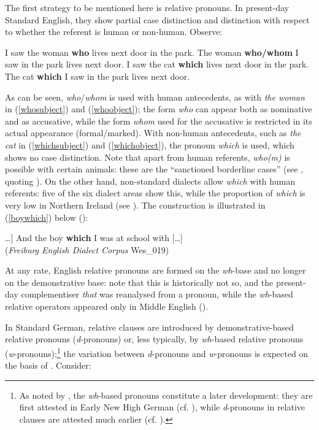The first strategy to be mentioned here is relative pronouns. In present-day Standard English, they show partial case distinction and distinction with respect to whether the referent is human or non-human. Observe:

\ea
\ea I saw the woman \textbf{who} lives next door in the park. \label{whosubject}
\ex The woman \textbf{who/whom} I saw in the park lives next door. \label{whoobject}
\ex I saw the cat \textbf{which} lives next door in the park. \label{whichsubject}
\ex The cat \textbf{which} I saw in the park lives next door. \label{whichobject}
\z
\z

As can be seen, \textit{who}/\textit{whom} is used with human antecedents, as with \textit{the woman} in (\ref{whosubject}) and (\ref{whoobject}); the form \textit{who} can appear both as nominative and as accusative, while the form \textit{whom} used for the accusative is restricted in its actual appearance (formal/marked). With non-human antecedents, such as \textit{the cat} in (\ref{whichsubject}) and (\ref{whichobject}), the pronoun \textit{which} is used, which shows no case distinction. Note that apart from human referents, \textit{who(m)} is possible with certain animals: these are the ``sanctioned borderline cases'' (see \citealt[41]{herrmann2005}, quoting \citealt{quirkgreenbaumleechsvartvik1985}). On the other hand, non-standard dialects allow \textit{which} with human referents: five of the six dialect areas show this, while the proportion of \textit{which} is very low in Northern Ireland (see \citealt[41]{herrmann2005}). The construction is illustrated in (\ref{boywhich}) below (\citealt[42, ex. 4a]{herrmann2005}):

\ea {[}\ldots] And the boy \textbf{which} I was at school with [\ldots] \label{boywhich}\\
(\textit{Freiburg English Dialect Corpus} Wes\_019)
\z

At any rate, English relative pronouns are formed on the \textit{wh}-base and no longer on the demonstrative base: note that this is historically not so, and the present-day complementiser \textit{that} was reanalysed from a pronoun, while the \textit{wh}-based relative operators appeared only in Middle English (\citealt{vangelderen2009}).

In Standard German, relative clauses are introduced by demonstrative-based relative pronouns (\textit{d}-pronouns) or, less typically, by \textit{wh}-based relative pronouns (\textit{w}-pronouns);\footnote{As noted by \citet[140]{coniglio2019}, the \textit{wh}-based pronouns constitute a later development: they are first attested in Early New High German (cf. \citealt[717ff]{behaghel1928}), while \textit{d}-pronouns in relative clauses are attested much earlier (cf. \citealt[114ff]{fleischmann1973}).} the variation between \textit{d}-pronouns and \textit{w}-pronouns is expected on the basis of \citet{brandnerbraeuning2013}. Consider:

